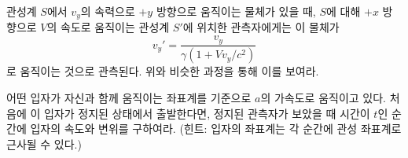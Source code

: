 \begin{exercise}
관성계 $S$에서 $v_y$의 속력으로 $+y$ 방향으로 움직이는 물체가 있을 때, $S$에 대해 $+x$ 방향으로 $V$의 속도로 움직이는 관성계 $S'$에 위치한 관측자에게는 이 물체가
\begin{equation}
v_y'=\frac{v_y}{\gamma(1+Vv_y/c^2)}
\end{equation}
로 움직이는 것으로 관측된다. 위와 비슷한 과정을 통해 이를 보여라.
\end{exercise}

\begin{exercise}[등가속도 운동]
어떤 입자가 자신과 함께 움직이는 좌표계를 기준으로 $a$의 가속도로 움직이고 있다. 처음에 이 입자가 정지된 상태에서 출발한다면, 정지된 관측자가 보았을 때 시간이 $t$인 순간에 입자의 속도와 변위를 구하여라. (힌트: 입자의 좌표계는 각 순간에 관성 좌표계로 근사될 수 있다.)
\end{exercise}

